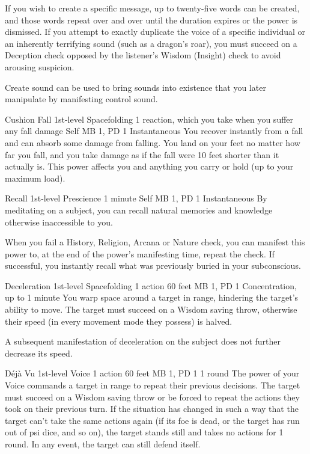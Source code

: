   If you wish to create a specific message,
  up to twenty-five words can be created,
  and those words repeat over and over until the duration expires
  or the power is dismissed.
  If you attempt to exactly duplicate the voice of a specific individual
  or an inherently terrifying sound
  (such as a dragon's roar),
  you must succeed on a Deception check opposed
  by the listener's Wisdom (Insight) check to avoid arousing suspicion.
  
  Create sound can be used to bring sounds into existence that you later
  manipulate by manifesting control sound.

\DndPowerHeader%
  {Cushion Fall}
  {1st-level Spacefolding}
  {1 reaction, which you take when you suffer any fall damage}
  {Self}
  {MB 1, PD 1}
  {Instantaneous}
  You recover instantly from a fall
  and can absorb some damage from falling.
  You land on your feet no matter how far you fall,
  and you take damage as if the fall were
  10 feet shorter than it actually is.
  This power affects you and anything you carry or hold
  (up to your maximum load).

\DndPowerHeader%
  {Recall}
  {1st-level Prescience}
  {1 minute}
  {Self}
  {MB 1, PD 1}
  {Instantaneous}
By meditating on a subject, you can recall
natural memories and knowledge otherwise inaccessible to you.

When you fail a History, Religion, Arcana or Nature check,
you can manifest this power to, at the end of the
power's manifesting time, repeat the check.
If successful, you instantly recall
what was previously buried in your subconscious.

\DndPowerHeader%
  {Deceleration}
  {1st-level Spacefolding}
  {1 action}
  {60 feet}
  {MB 1, PD 1}
  {Concentration, up to 1 minute}
You warp space around a target in range,
hindering the target's ability to move.
The target must succeed on a Wisdom saving throw,
otherwise their speed (in every movement mode they possess) is halved.

A subsequent manifestation of deceleration on the subject
does not further decrease its speed.

\DndPowerHeader%
  {Déjà Vu}
  {1st-level Voice}
  {1 action}
  {60 feet}
  {MB 1, PD 1}
  {1 round}
The power of your Voice commands a target in range
to repeat their previous decisions.
The target must succeed on a Wisdom saving throw
or be forced to repeat the actions they took on their previous turn.
If the situation has changed in such a way that the target
can't take the same actions again
(if its foe is dead, or the target has run out of psi dice, and so on),
the target stands still and takes no actions for 1 round.
In any event, the target can still defend itself.

